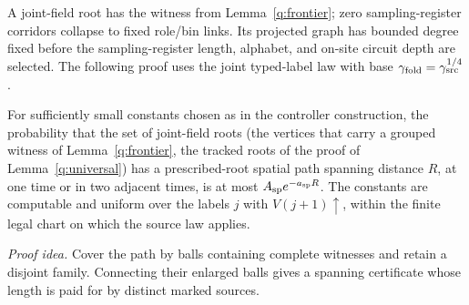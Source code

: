 A joint-field root has the witness from Lemma~\ref{q:frontier};
zero sampling-register corridors collapse to fixed role/bin links. Its projected
graph has bounded degree fixed before the sampling-register length, alphabet,
and on-site circuit depth are selected. The following proof uses
the joint typed-label law with base \(\gamma_{\rm fold}=\gamma_{\rm src}^{1/4}\).
\begin{lemma}\label{q:spatial}
For sufficiently small constants chosen as in the controller
construction, the probability that the set of joint-field roots (the
vertices that carry a grouped witness of Lemma~\ref{q:frontier}, the
tracked roots of the proof of Lemma~\ref{q:universal}) has a
prescribed-root spatial path spanning distance \(R\), at one time or
in two adjacent times, is at most \(A_{\rm sp}e^{-a_{\rm sp}R}\). The constants
are computable and uniform over the labels \(j\) with \(V(j+1)\uparrow\), within the
finite legal chart on which the source law applies.
\end{lemma}
\par\noindent\emph{Proof idea.} Cover the path by balls containing complete witnesses and retain a disjoint family. Connecting their enlarged balls gives a spanning certificate whose length is paid for by distinct marked sources.

